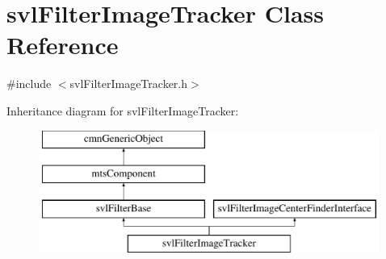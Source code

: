 \hypertarget{classsvl_filter_image_tracker}{}\section{svl\+Filter\+Image\+Tracker Class Reference}
\label{classsvl_filter_image_tracker}


{\ttfamily \#include $<$svl\+Filter\+Image\+Tracker.\+h$>$}

Inheritance diagram for svl\+Filter\+Image\+Tracker\+:\begin{figure}[H]
\begin{center}
\leavevmode
\includegraphics[height=4.000000cm]{d9/df0/classsvl_filter_image_tracker}
\end{center}
\end{figure}
